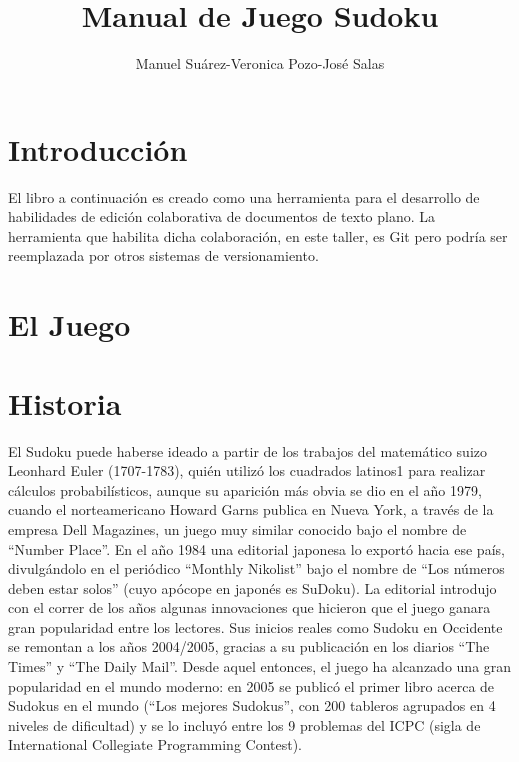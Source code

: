 \documentclass[12pt,oneside]{book}
\title{Manual de Juego Sudoku}
\author{Manuel Suárez-Veronica Pozo-José Salas}
\begin{document}
\maketitle
\tableofcontents

\chapter{Introducción}
El libro a continuación es creado como una herramienta para el desarrollo de habilidades de edición colaborativa de documentos de texto plano. La herramienta que habilita dicha colaboración, en este taller, es Git pero podría ser reemplazada por otros sistemas de versionamiento.

\chapter{El Juego}

\chapter{Historia}
El Sudoku puede haberse ideado a partir de los trabajos del matemático suizo Leonhard Euler (1707-1783), quién utilizó los cuadrados latinos1 para realizar cálculos probabilísticos, aunque su aparición más obvia se dio en el año 1979, cuando el norteamericano Howard Garns publica en Nueva York, a través de la empresa Dell Magazines, un juego muy similar conocido bajo el nombre de “Number Place”. En el año 1984 una editorial japonesa lo exportó hacia ese país, divulgándolo en el periódico “Monthly Nikolist” bajo el nombre de “Los números deben estar solos” (cuyo apócope en japonés es SuDoku). La editorial introdujo con el correr de los años algunas innovaciones que hicieron que el juego ganara gran popularidad entre los lectores. 
Sus inicios reales como Sudoku en Occidente se remontan a los años 2004/2005, gracias a su publicación en los diarios “The Times” y “The Daily Mail”. Desde aquel entonces, el juego ha alcanzado una gran popularidad en el mundo moderno: en 2005 se publicó el primer libro acerca de Sudokus en el mundo (“Los mejores Sudokus”, con 200 tableros agrupados en 4 niveles de dificultad) y se lo incluyó entre los 9 problemas del ICPC (sigla de International Collegiate Programming Contest). 
\end{document}
